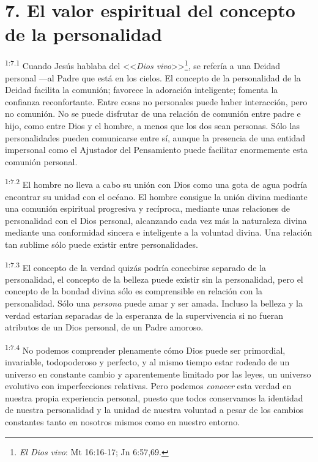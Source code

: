 \section*{7. El valor espiritual del concepto de la personalidad}
\par
\textsuperscript{1:7.1} Cuando Jesús hablaba del <<\textit{Dios vivo}>>\footnote{\textit{El Dios vivo}: Mt 16:16-17; Jn 6:57,69.}, se refería a una Deidad personal ---al Padre que está en los cielos. El concepto de la personalidad de la Deidad facilita la comunión; favorece la adoración inteligente; fomenta la confianza reconfortante. Entre cosas no personales puede haber interacción, pero no comunión. No se puede disfrutar de una relación de comunión entre padre e hijo, como entre Dios y el hombre, a menos que los dos sean personas. Sólo las personalidades pueden comunicarse entre sí, aunque la presencia de una entidad impersonal como el Ajustador del Pensamiento puede facilitar enormemente esta comunión personal.

\par
\textsuperscript{1:7.2} El hombre no lleva a cabo su unión con Dios como una gota de agua podría encontrar su unidad con el océano. El hombre consigue la unión divina mediante una comunión espiritual progresiva y recíproca, mediante unas relaciones de personalidad con el Dios personal, alcanzando cada vez más la naturaleza divina mediante una conformidad sincera e inteligente a la voluntad divina. Una relación tan sublime sólo puede existir entre personalidades.

\par
\textsuperscript{1:7.3} El concepto de la verdad quizás podría concebirse separado de la personalidad, el concepto de la belleza puede existir sin la personalidad, pero el concepto de la bondad divina sólo es comprensible en relación con la personalidad. Sólo una \textit{persona} puede amar y ser amada. Incluso la belleza y la verdad estarían separadas de la esperanza de la supervivencia si no fueran atributos de un Dios personal, de un Padre amoroso.

\par
\textsuperscript{1:7.4} No podemos comprender plenamente cómo Dios puede ser primordial, invariable, todopoderoso y perfecto, y al mismo tiempo estar rodeado de un universo en constante cambio y aparentemente limitado por las leyes, un universo evolutivo con imperfecciones relativas. Pero podemos \textit{conocer} esta verdad en nuestra propia experiencia personal, puesto que todos conservamos la identidad de nuestra personalidad y la unidad de nuestra voluntad a pesar de los cambios constantes tanto en nosotros mismos como en nuestro entorno.

